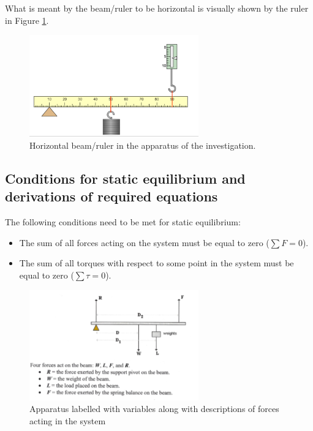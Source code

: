 \documentclass[letterpaper, 12pt]{article}
\begin{document}
What is meant by the beam/ruler to be horizontal is visually shown by the ruler in
Figure \ref*{fig:horizontal}.

\begin{figure}[H]
    \centering
    \includegraphics[width=0.65\textwidth]{horizontal}
    \caption{Horizontal beam/ruler in the apparatus of the investigation.}
    \label{fig:horizontal}
\end{figure}

\subsection{Conditions for static equilibrium and derivations of required equations}

The following conditions need to be met for static equilibrium:
\begin{itemize}
    \item The sum of all forces acting on the system must be equal to zero ($\sum F = 0$).
    \item The sum of all torques with respect to some point in the system must be equal to zero ($\sum \tau = 0$).
\end{itemize}


\begin{figure}[H]
    \centering
    \includegraphics[width=0.65\textwidth]{labelled apparatus and variables}
    \caption{Apparatus labelled with variables along with descriptions of forces acting in the system}
    \label{fig:labapparatus}
\end{figure}
\end{document}
